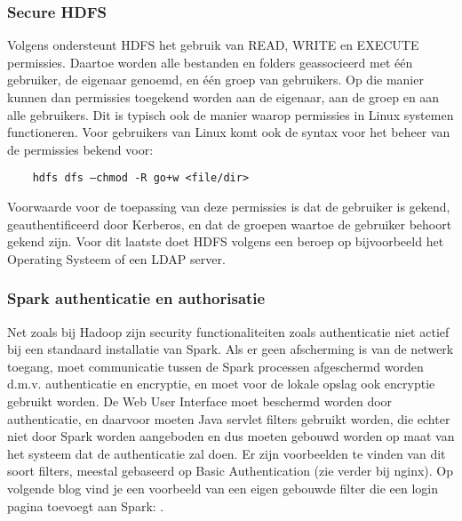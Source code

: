 \subsubsection{Secure HDFS}
Volgens \textcite{Hadoop2023b} ondersteunt HDFS het gebruik van READ, WRITE en EXECUTE permissies. Daartoe worden alle bestanden en folders geassocieerd met één gebruiker, de eigenaar genoemd, en één groep van gebruikers.
Op die manier kunnen dan permissies toegekend worden aan de eigenaar, aan de groep en aan alle gebruikers. Dit is typisch ook de manier waarop permissies in Linux systemen functioneren.
\newline
Voor gebruikers van Linux komt ook de syntax voor het beheer van de permissies bekend voor:
\begin{lstlisting}
    hdfs dfs –chmod -R go+w <file/dir>
\end{lstlisting}
Voorwaarde voor de toepassing van deze permissies is dat de gebruiker is gekend, geauthentificeerd door Kerberos, en dat de groepen waartoe de gebruiker behoort gekend zijn. Voor dit laatste doet HDFS volgens \textcite{Hadoop2023c} een beroep op bijvoorbeeld het Operating Systeem of een LDAP server.


\subsubsection {Spark authenticatie en authorisatie} \autocite{Spark2023c}
Net zoals bij Hadoop zijn security functionaliteiten zoals authenticatie niet actief bij een standaard installatie van Spark. Als er geen afscherming is van de netwerk toegang, moet communicatie tussen de Spark processen afgeschermd worden d.m.v. authenticatie en encryptie, en moet voor de lokale opslag ook encryptie gebruikt worden. De Web User Interface moet beschermd worden door authenticatie, en daarvoor moeten Java servlet filters gebruikt worden, die echter niet door Spark worden aangeboden en dus moeten gebouwd worden op maat van het systeem dat de authenticatie zal doen.
Er zijn voorbeelden te vinden van dit soort filters, meestal gebaseerd op Basic Authentication (zie verder bij nginx). Op volgende blog vind je een voorbeeld van een eigen gebouwde filter die een login pagina toevoegt aan Spark: \textcite{Cacoveanu2019}.


